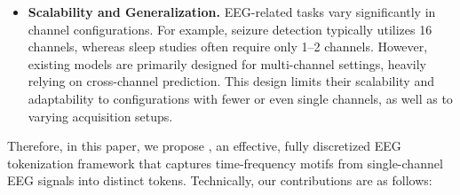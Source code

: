 \begin{itemize}[left=0pt]
     \item \textbf{Scalability and Generalization. } 
     EEG-related tasks vary significantly in channel configurations. 
     For example, seizure detection typically utilizes 16 channels, whereas sleep studies often require only 1–2 channels. 
     However, existing models are primarily designed for multi-channel settings, heavily relying on cross-channel prediction. 
     This design limits their scalability and adaptability to configurations with fewer or even single channels, as well as to varying acquisition setups.

    
\end{itemize}


Therefore, in this paper, we propose \method, an effective, fully discretized EEG tokenization framework that captures time-frequency motifs from single-channel EEG signals into distinct tokens. 
Technically, our contributions are as follows:








